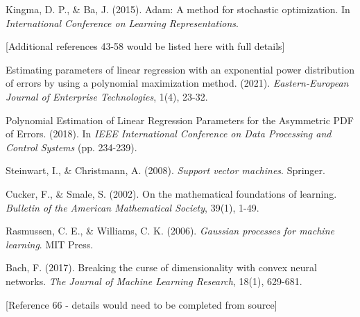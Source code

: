 \documentclass[12pt,a4paper]{article}
\begin{document}
\begin{thebibliography}{99}
		
		
		Kingma, D. P., \& Ba, J. (2015). Adam: A method for stochastic optimization. In \textit{International Conference on Learning Representations}.
		
		[Additional references 43-58 would be listed here with full details]
		
		Estimating parameters of linear regression with an exponential power distribution of errors by using a polynomial maximization method. (2021). \textit{Eastern-European Journal of Enterprise Technologies}, 1(4), 23-32.
		
		Polynomial Estimation of Linear Regression Parameters for the Asymmetric PDF of Errors. (2018). In \textit{IEEE International Conference on Data Processing and Control Systems} (pp. 234-239).
		
		
		
		Steinwart, I., \& Christmann, A. (2008). \textit{Support vector machines}. Springer.
		
		Cucker, F., \& Smale, S. (2002). On the mathematical foundations of learning. \textit{Bulletin of the American Mathematical Society}, 39(1), 1-49.
		
		Rasmussen, C. E., \& Williams, C. K. (2006). \textit{Gaussian processes for machine learning}. MIT Press.
		
		Bach, F. (2017). Breaking the curse of dimensionality with convex neural networks. \textit{The Journal of Machine Learning Research}, 18(1), 629-681.
		
		[Reference 66 - details would need to be completed from source]
		
	\end{thebibliography}
	
\end{document}
